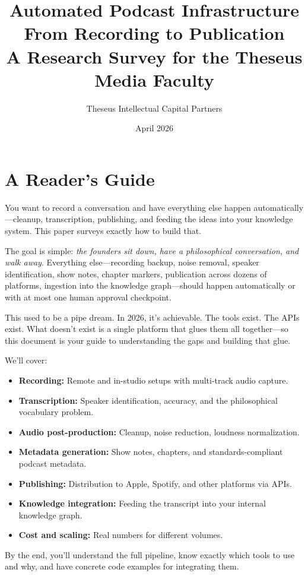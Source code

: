 \documentclass[11pt,letterpaper]{article}
\title{\textbf{\Large Automated Podcast Infrastructure}\\[8pt]\large From Recording to Publication\\[12pt]\normalsize A Research Survey for the Theseus Media Faculty}
\author{Theseus Intellectual Capital Partners}
\date{April 2026}
\begin{document}
\maketitle

\section*{A Reader's Guide}

\noindent You want to record a conversation and have everything else happen automatically—cleanup, transcription, publishing, and feeding the ideas into your knowledge system. This paper surveys exactly how to build that.

The goal is simple: \textit{the founders sit down, have a philosophical conversation, and walk away}. Everything else—recording backup, noise removal, speaker identification, show notes, chapter markers, publication across dozens of platforms, ingestion into the knowledge graph—should happen automatically or with at most one human approval checkpoint.

This used to be a pipe dream. In 2026, it's achievable. The tools exist. The APIs exist. What doesn't exist is a single platform that glues them all together—so this document is your guide to understanding the gaps and building that glue.

We'll cover:
\begin{itemize}
  \item \textbf{Recording:} Remote and in-studio setups with multi-track audio capture.
  \item \textbf{Transcription:} Speaker identification, accuracy, and the philosophical vocabulary problem.
  \item \textbf{Audio post-production:} Cleanup, noise reduction, loudness normalization.
  \item \textbf{Metadata generation:} Show notes, chapters, and standards-compliant podcast metadata.
  \item \textbf{Publishing:} Distribution to Apple, Spotify, and other platforms via APIs.
  \item \textbf{Knowledge integration:} Feeding the transcript into your internal knowledge graph.
  \item \textbf{Cost and scaling:} Real numbers for different volumes.
\end{itemize}

\noindent By the end, you'll understand the full pipeline, know exactly which tools to use and why, and have concrete code examples for integrating them.
\end{document}
